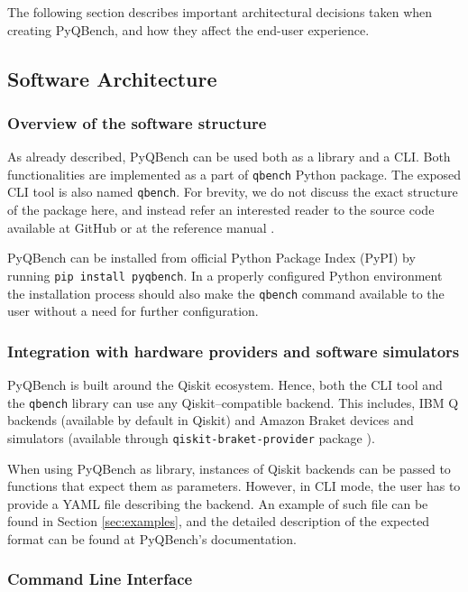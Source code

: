 \documentclass[preprint,12pt, a4paper, dvipsnames]{elsarticle}
\newcommand{\1}{{\rm 1\hspace{-0.9mm}l}}
\theoremstyle{definition}
\begin{document}
The following section describes important architectural decisions taken when creating PyQBench, and
how they affect the end-user experience.

\subsection{Software Architecture}\label{sec:sortware-architecture}

\subsubsection{Overview of the software structure}
As already described, PyQBench can be used both as a library and a CLI. Both functionalities are
implemented as a part of \texttt{qbench} Python package. The exposed CLI tool is also named
\texttt{qbench}. For brevity, we do not discuss the exact structure of the package here, and instead
refer an interested reader to the source code available at GitHub \cite{pyqbenchgithub} or at the reference manual
\cite{pyqbenchdocs}.

PyQBench can be installed from official Python Package Index (PyPI) by running \texttt{pip install
pyqbench}. In a properly configured Python environment the installation process should also make the
\texttt{qbench} command available to the user without a need for further configuration.

\subsubsection{Integration with hardware providers and software simulators}

PyQBench is built around the Qiskit \cite{qiskit} ecosystem. Hence, both the CLI tool and the
\texttt{qbench} library can use any Qiskit--compatible backend. This includes, IBM Q
backends (available by default in Qiskit) and Amazon Braket devices and simulators (available
through \texttt{qiskit-braket-provider} package \cite{qiskit-braket-provider, qiskit-braket-provider-github}).

When using PyQBench as library, instances of Qiskit backends can be passed to functions that expect
them as parameters. However, in CLI mode, the user has to provide a YAML file describing the
backend. An example of such file can be found in Section \ref{sec:examples}, and the detailed description of
the expected format can be found at PyQBench's documentation.

\subsubsection{Command Line Interface}
\label{sec:cli}
\end{document}

